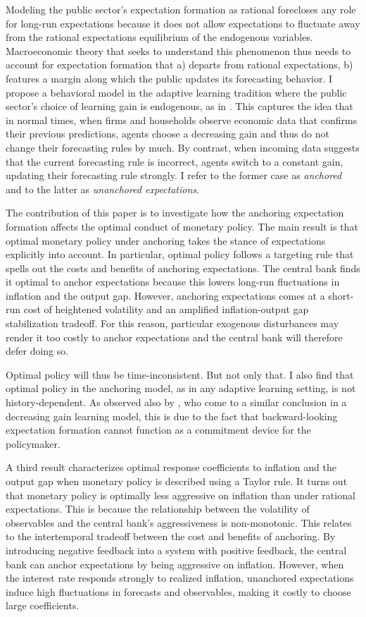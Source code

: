 \documentclass[11pt]{article}
\renewcommand{\[}{\begin{equation}}
\renewcommand{\]}{\end{equation}}
\begin{document}
Modeling the public sector's expectation formation as rational forecloses any role for long-run expectations because it does not allow expectations to fluctuate away from the rational expectations equilibrium of the endogenous variables. Macroeconomic theory that seeks to understand this phenomenon thus needs to account for expectation formation that a) departs from rational expectations, b) features a margin along which the public updates its forecasting behavior. I propose a behavioral model in the adaptive learning tradition where the public sector's choice of learning gain is endogenous, as in \cite{carvalho2019anchored}. This captures the idea that in normal times, when firms and households observe economic data that confirms their previous predictions, agents choose a decreasing gain and thus do not change their forecasting rules by much. By contrast, when incoming data suggests that the current forecasting rule is incorrect, agents switch to a constant gain, updating their forecasting rule strongly. I refer to the former case as \emph{anchored} and to the latter as \emph{unanchored expectations}.

The contribution of this paper is to investigate how the anchoring expectation formation affects the optimal conduct of monetary policy. The main result is that optimal monetary policy under anchoring takes the stance of expectations explicitly into account. In particular, optimal policy follows a targeting rule that spells out the costs and benefits of anchoring expectations. The central bank finds it optimal to anchor expectations because this lowers long-run fluctuations in inflation and the output gap. However, anchoring expectations comes at a short-run cost of heightened volatility and an amplified inflation-output gap stabilization tradeoff. For this reason, particular exogenous disturbances may render it too costly to anchor expectations and the central bank will therefore defer doing so.

Optimal policy will thus be time-inconsistent. But not only that. I also find that optimal policy in the anchoring model, as in any adaptive learning setting, is not history-dependent. As observed also by \cite{mele2019perils}, who come to a similar conclusion in a decreasing gain learning model, this is due to the fact that backward-looking expectation formation cannot function as a commitment device for the policymaker. 

A third result characterizes optimal response coefficients to inflation and the output gap when monetary policy is described using a Taylor rule. It turns out that monetary policy is optimally less aggressive on inflation than under rational expectations. This is because the relationship between the volatility of observables and the central bank's aggressiveness is non-monotonic. This relates to the intertemporal tradeoff between the cost and benefits of anchoring. By introducing negative feedback into a system with positive feedback, the central bank can anchor expectations by being aggressive on inflation. However, when the interest rate responds strongly to realized inflation, unanchored expectations induce high fluctuations in forecasts and observables, making it costly to choose large coefficients. 
\end{document}

